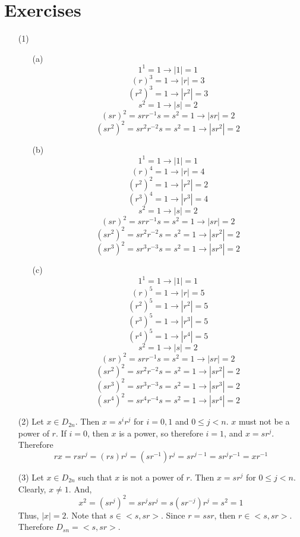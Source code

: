 \documentclass[12pt]{article}
\begin{document}
\section*{Exercises}
\begin{itemize}
\item[(1)]
\begin{itemize}
\item[(a)]
$$1^1 = 1 \rightarrow |1| = 1$$
$$(r)^3 = 1 \rightarrow |r| = 3$$
$$(r^2)^3 = 1 \rightarrow |r^2| = 3$$
$$s^2 = 1 \rightarrow |s| = 2$$
$$(sr)^2 = srr^{-1}s = s^2 = 1 \rightarrow |sr| = 2$$
$$(sr^2)^2 = sr^2r^{-2}s = s^2 = 1 \rightarrow |sr^2| = 2$$
\item[(b)]
$$1^1 = 1 \rightarrow |1| = 1$$
$$(r)^4 = 1 \rightarrow |r| = 4$$
$$(r^2)^2 = 1 \rightarrow |r^2| = 2$$
$$(r^3)^4 = 1 \rightarrow |r^3| = 4$$
$$s^2 = 1 \rightarrow |s| = 2$$
$$(sr)^2 = srr^{-1}s = s^2 = 1 \rightarrow |sr| = 2$$
$$(sr^2)^2 = sr^2r^{-2}s = s^2 = 1 \rightarrow |sr^2| = 2$$
$$(sr^3)^2 = sr^3r^{-3}s = s^2 = 1 \rightarrow |sr^3| = 2$$
\item[(c)]
$$1^1 = 1 \rightarrow |1| = 1$$
$$(r)^5 = 1 \rightarrow |r| = 5$$
$$(r^2)^5 = 1 \rightarrow |r^2| = 5$$
$$(r^3)^5 = 1 \rightarrow |r^3| = 5$$
$$(r^4)^5 = 1 \rightarrow |r^4| = 5$$
$$s^2 = 1 \rightarrow |s| = 2$$
$$(sr)^2 = srr^{-1}s = s^2 = 1 \rightarrow |sr| = 2$$
$$(sr^2)^2 = sr^2r^{-2}s = s^2 = 1 \rightarrow |sr^2| = 2$$
$$(sr^3)^2 = sr^3r^{-3}s = s^2 = 1 \rightarrow |sr^3| = 2$$
$$(sr^4)^2 = sr^4r^{-4}s = s^2 = 1 \rightarrow |sr^4| = 2$$
\end{itemize}
\item[(2)]
Let $x \in D_{2n}$. Then $x = s^ir^j$ for $i = 0, 1$ and $0 \leq j < n$. $x$ must not be a power of $r$. If $i = 0$, then $x$ is a power, so therefore $i = 1$, and $x = sr^j$. Therefore
$$rx = rsr^j = (rs)r^j = (sr^{-1})r^j = sr^{j - 1} = sr^jr^{-1} = xr^{-1}$$
\item[(3)]
Let $x \in D_{2n}$ such that $x$ is not a power of $r$. Then $x = sr^j$ for $0 \leq j < n$. Clearly, $x \neq 1$. And,
$$x^2 = (sr^j)^2 = sr^jsr^j = s(sr^{-j})r^j = s^2 = 1$$
Thus, $|x| = 2$. Note that $s \in <s, sr>$. Since $r = ssr$, then $r \in <s, sr>$. Therefore $D_{sn} = <s, sr>$.
\end{itemize}
\end{document}
